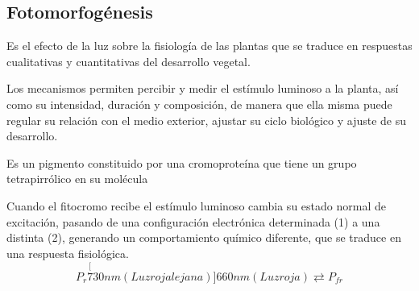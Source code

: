 




\subsection{Fotomorfogénesis}
Es el efecto de la luz sobre la fisiología de las plantas que se traduce en respuestas cualitativas y cuantitativas del desarrollo vegetal.

Los mecanismos permiten percibir y medir el estímulo luminoso a la planta, así como su intensidad, duración y composición, de manera que ella misma puede regular su relación con el medio exterior, ajustar su ciclo biológico y ajuste de su desarrollo.

\begin{definition}[Fitocromo]
    Es un pigmento constituido por una cromoproteína que tiene un grupo tetrapirrólico en su molécula
\end{definition}
Cuando el fitocromo recibe el estímulo luminoso cambia su estado normal de excitación, pasando de una configuración electrónica determinada (1) a una distinta (2), generando un comportamiento químico diferente, que se traduce en una respuesta fisiológica.
\begin{equation}
    P_r \stackrel[730 nm (Luz roja lejana)]{660 nm (Luz roja)}{\rightleftarrows} P_{fr}
\end{equation}

